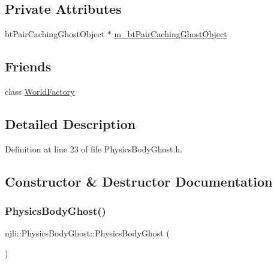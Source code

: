 \subsection*{Private Attributes}
\begin{DoxyCompactItemize}
\item 
bt\+Pair\+Caching\+Ghost\+Object $\ast$ \mbox{\hyperlink{classnjli_1_1_physics_body_ghost_a460197cbf7ec698c64ac6b7a95cb1418}{m\+\_\+bt\+Pair\+Caching\+Ghost\+Object}}
\end{DoxyCompactItemize}
\subsection*{Friends}
\begin{DoxyCompactItemize}
\item 
class \mbox{\hyperlink{classnjli_1_1_physics_body_ghost_acb96ebb09abe8f2a37a915a842babfac}{World\+Factory}}
\end{DoxyCompactItemize}


\subsection{Detailed Description}


Definition at line 23 of file Physics\+Body\+Ghost.\+h.



\subsection{Constructor \& Destructor Documentation}
\mbox{\label{classnjli_1_1_physics_body_ghost_a657ece9b7062ed0d514b9d62cf88c110}} 
\subsubsection{\texorpdfstring{Physics\+Body\+Ghost()}{PhysicsBodyGhost()}\hspace{0.1cm}{\footnotesize\ttfamily [1/3]}}
{\footnotesize\ttfamily njli\+::\+Physics\+Body\+Ghost\+::\+Physics\+Body\+Ghost (\begin{DoxyParamCaption}{ }\end{DoxyParamCaption})\hspace{0.3cm}{\ttfamily [protected]}}

